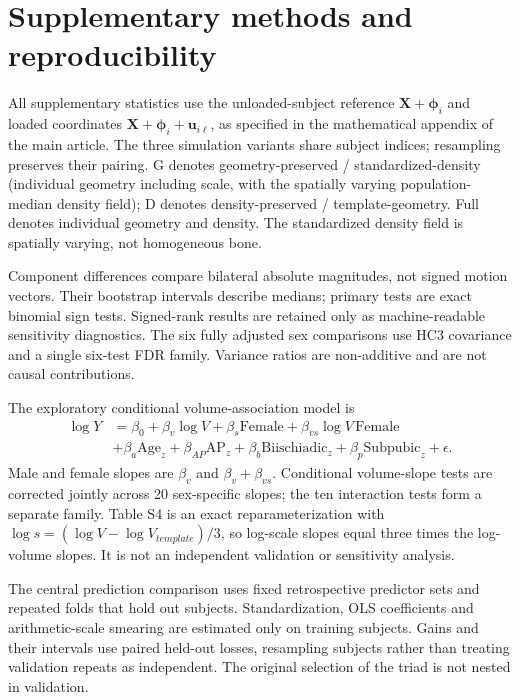 \section{Supplementary methods and reproducibility}
All supplementary statistics use the unloaded-subject reference $\mathbf X+\boldsymbol\phi_i$ and loaded coordinates $\mathbf X+\boldsymbol\phi_i+\mathbf u_{i\ell}$, as specified in the mathematical appendix of the main article. The three simulation variants share subject indices; resampling preserves their pairing. G denotes geometry-preserved / standardized-density (individual geometry including scale, with the spatially varying population-median density field); D denotes density-preserved / template-geometry. Full denotes individual geometry and density. The standardized density field is spatially varying, not homogeneous bone.

Component differences compare bilateral absolute magnitudes, not signed motion vectors. Their bootstrap intervals describe medians; primary tests are exact binomial sign tests. Signed-rank results are retained only as machine-readable sensitivity diagnostics. The six fully adjusted sex comparisons use HC3 covariance and a single six-test FDR family. Variance ratios are non-additive and are not causal contributions.

The exploratory conditional volume-association model is
\begin{align}
\log Y&=\beta_0+\beta_v\log V+\beta_s\mathrm{Female}+\beta_{vs}\log V\,\mathrm{Female}\nonumber\\
&+\beta_a\mathrm{Age}_z+\beta_{AP}\mathrm{AP}_z+\beta_b\mathrm{Biischiadic}_z+\beta_p\mathrm{Subpubic}_z+\epsilon.
\end{align}
Male and female slopes are $\beta_v$ and $\beta_v+\beta_{vs}$. Conditional volume-slope tests are corrected jointly across 20 sex-specific slopes; the ten interaction tests form a separate family. Table S4 is an exact reparameterization with $\log s=(\log V-\log V_{template})/3$, so log-scale slopes equal three times the log-volume slopes. It is not an independent validation or sensitivity analysis.

The central prediction comparison uses fixed retrospective predictor sets and repeated folds that hold out subjects. Standardization, OLS coefficients and arithmetic-scale smearing are estimated only on training subjects. Gains and their intervals use paired held-out losses, resampling subjects rather than treating validation repeats as independent. The original selection of the triad is not nested in validation.

